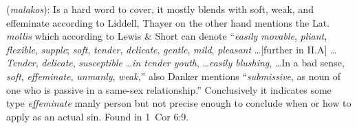 \item[Catamite (inconclusive),]

(\textit{malakos}):
Is a hard word to cover, it mostly blends with soft, weak, and effeminate according to Liddell, Thayer on the other hand mentions the Lat. \emph{mollis} which according to Lewis \& Short can denote ``\emph{easily movable}, \emph{pliant}, \emph{flexible}, \emph{supple}; \emph{soft}, \emph{tender}, \emph{delicate}, \emph{gentle}, \emph{mild}, \emph{pleasant} \ldots [further in II.A] \ldots \emph{Tender}, \emph{delicate}, \emph{susceptible} \ldots \emph{in tender youth}, \ldots \emph{easily blushing}, \ldots In a bad sense, \emph{soft}, \emph{effeminate}, \emph{unmanly}, \emph{weak},'' also Danker mentions ``\emph{submissive}, as noun of one who is passive in a same-sex relationship.'' Conclusively it indicates some type \emph{effeminate} manly person but not precise enough to conclude when or how to apply as an actual sin.
Found in 1~Cor 6:9.
